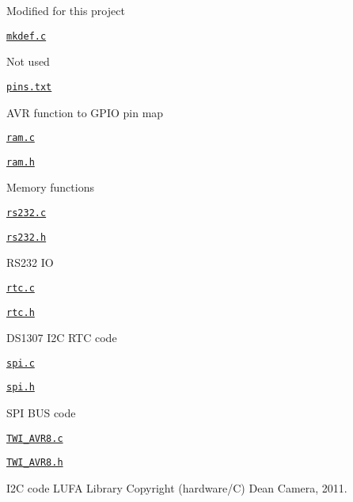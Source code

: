 \begin{DoxyItemize}
\begin{DoxyItemize}
\begin{DoxyItemize}
\begin{DoxyItemize}
\item Modified for this project
\end{DoxyItemize}
\end{DoxyItemize}
\item \href{hardware/mkdef.c}{\tt mkdef.\+c}
\begin{DoxyItemize}
\item Not used
\end{DoxyItemize}
\item \href{hardware/pins.txt}{\tt pins.\+txt}
\begin{DoxyItemize}
\item A\+VR function to G\+P\+IO pin map
\end{DoxyItemize}
\item \href{hardware/ram.c}{\tt ram.\+c}
\item \href{hardware/ram.h}{\tt ram.\+h}
\begin{DoxyItemize}
\item Memory functions
\end{DoxyItemize}
\item \href{hardware/rs232.c}{\tt rs232.\+c}
\item \href{hardware/rs232.h}{\tt rs232.\+h}
\begin{DoxyItemize}
\item R\+S232 IO
\end{DoxyItemize}
\item \href{hardware/rtc.c}{\tt rtc.\+c}
\item \href{hardware/rtc.h}{\tt rtc.\+h}
\begin{DoxyItemize}
\item D\+S1307 I2C R\+TC code
\end{DoxyItemize}
\item \href{hardware/spi.c}{\tt spi.\+c}
\item \href{hardware/spi.h}{\tt spi.\+h}
\begin{DoxyItemize}
\item S\+PI B\+US code
\end{DoxyItemize}
\item \href{hardware/TWI_AVR8.c}{\tt T\+W\+I\+\_\+\+A\+V\+R8.\+c}
\item \href{hardware/TWI_AVR8.h}{\tt T\+W\+I\+\_\+\+A\+V\+R8.\+h}
\begin{DoxyItemize}
\item I2C code L\+U\+FA Library Copyright (hardware/C) Dean Camera, 2011.
\end{DoxyItemize}

\end{DoxyItemize}
\end{DoxyItemize}
